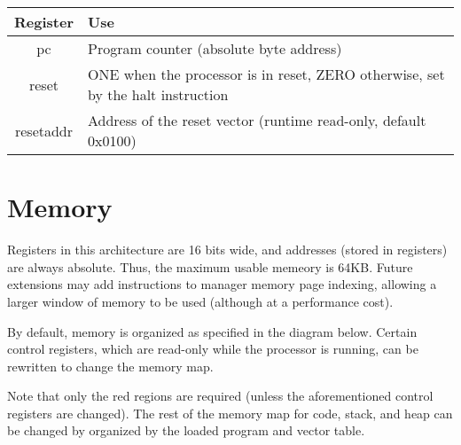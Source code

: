 \documentclass{article}
\begin{document}
\begin{tabular}{|cp{10cm}|}
  \hline
  Register & Use \\
  \hline
  pc & Program counter (absolute byte address) \\
  reset & ONE when the processor is in reset, ZERO otherwise, set by the halt instruction \\
  resetaddr & Address of the reset vector (runtime read-only, default 0x0100) \\
  \hline
\end{tabular}


\section{Memory}
Registers in this architecture are 16 bits wide, and addresses (stored in registers) are always
absolute. Thus, the maximum usable memeory is 64KB. Future extensions may add instructions
to manager memory page indexing, allowing a larger window of memory to be used (although at a
performance cost).

By default, memory is organized as specified in the diagram below. Certain control registers,
which are read-only while the processor is running, can be rewritten to change the memory map.

Note that only the red regions are required (unless the aforementioned control registers are
changed). The rest of the memory map for code, stack, and heap can be changed by organized by
the loaded program and vector table.

\end{document}
